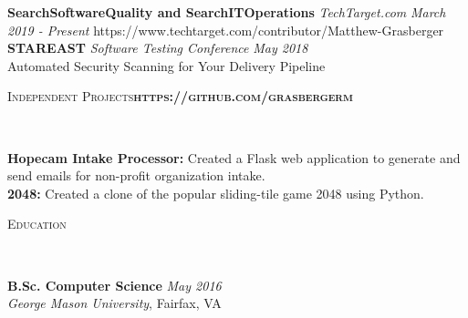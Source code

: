 \documentclass[9pt]{article}
\newenvironment{changemargin}[2]{%
  \begin{list}{}{%
    \setlength{\topsep}{0pt}%
    \setlength{\leftmargin}{#1}%
    \setlength{\rightmargin}{#2}%
    \setlength{\listparindent}{\parindent}%
    \setlength{\itemindent}{\parindent}%
    \setlength{\parsep}{\parskip}%
  }%
  \item[]}{\end{list}
}
\newcommand{\lineover}{
	\begin{changemargin}{-0.05in}{-0.05in}
		\vspace*{-8pt}
		\hrulefill \\
		\vspace*{-2pt}
	\end{changemargin}
}
\newcommand{\header}[1]{
	\begin{changemargin}{-0.5in}{-0.5in}
		\scshape{#1}\\
  	\lineover
	\end{changemargin}
}
\newenvironment{body} {
	\vspace*{-10pt}
	\begin{changemargin}{-0.25in}{-0.5in}
  }	
	{\end{changemargin}
}
\begin{document}
\begin{body}
	\vspace{14pt}
        \textbf{SearchSoftwareQuality and SearchITOperations }\emph{TechTarget.com} \hfill \emph{March 2019 - Present}{} https://www.techtarget.com/contributor/Matthew-Grasberger\\
	\smallskip
	\vspace{4pt}
	\textbf{STAREAST }\emph{Software Testing Conference} \hfill \emph{May 2018}{}\\
	Automated Security Scanning for Your Delivery Pipeline
	\vspace{4pt}
\end{body}
\vspace{10pt}
\smallskip
\header{Independent Projects\hfill \textbf{https://github.com/grasbergerm}}

\begin{body}
	\vspace{14pt}
	{\textbf{Hopecam Intake Processor:}}{} Created a Flask web application to generate and send emails for non-profit organization intake. \\
	\vspace{4pt}
	{\textbf{2048:}}{} Created a clone of the popular sliding-tile game 2048 using Python.\\
	\vspace{14pt}
\end{body}

\header{Education}

\begin{body}
	\vspace{14pt}
	\textbf{B.Sc. Computer Science }{} \hfill \emph{May 2016}\\
	\emph{George Mason University}, Fairfax, VA\\
	\vspace{4pt}
\end{body}
\smallskip
\end{document}
